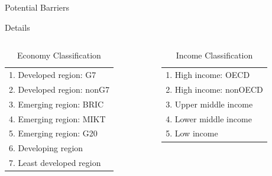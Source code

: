 \documentclass{beamer}
\begin{document}
\begin{frame}{Potential Barriers}
\vspace{-.3in}
	\begin{center}
		\begin{scriptsize}
		\end{scriptsize}
	\end{center}
\end{frame}

\begin{frame}[fragile]{Details}
\vspace{-.3in}
		\begin{scriptsize}
		\begin{columns}[T]
		\begin{column}{0.5\textwidth}
			\begin{table}
			\caption{Economy Classification}
			\begin{tabular}{l}
				1. Developed region: G7\\ 
				2. Developed region: nonG7\\ 
				3. Emerging region: BRIC\\ 
				4. Emerging region: MIKT\\ 
				5. Emerging region: G20\\ 
				6. Developing region\\ 
				7. Least developed region\\		
			\end{tabular}
			\end{table}
		\end{column}
		\begin{column}{0.5\textwidth}
			\begin{table}
			\caption{Income Classification}
			\begin{tabular}{l}
					1. High income: OECD\\ 
					2. High income: nonOECD\\ 
					3. Upper middle income\\ 
					4. Lower middle income\\ 
					5. Low income
			\end{tabular}
			\end{table}
		\end{column}
		\end{columns}
		
		

\end{scriptsize}
\end{frame}
\end{document}
